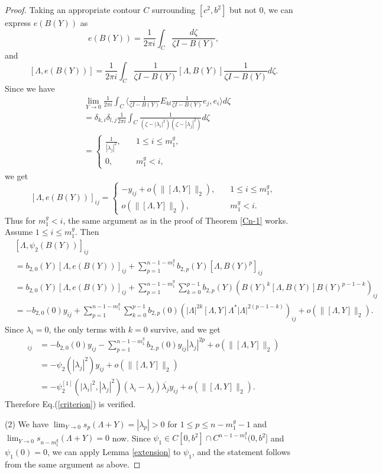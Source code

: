\documentclass[12pt]{article}
\theoremstyle{definition}
\numberwithin{equation}{section}
\newcommand{\inpr}[2]{\langle{#1,#2}\rangle}
\begin{document}
\begin{proof}
Taking an appropriate contour $C$ surrounding $[c^2,b^2]$ but not 0, we can express $e(B(Y))$ as 
\[e(B(Y))=\frac{1}{2\pi i}\int_C\frac{d\zeta}{\zeta I-B(Y)},\]
and 
\[[\Lambda,e(B(Y))]=\frac{1}{2\pi i}\int_C\frac{1}{\zeta I-B(Y)}[\Lambda,B(Y)]\frac{1}{\zeta I-B(Y)}d\zeta.\]
Since we have 
\begin{align*}
 & \lim_{Y\to 0}\frac{1}{2\pi i}\int_C\inpr{\frac{1}{\zeta I-B(Y)}E_{kl}\frac{1}{\zeta I-B(Y)}e_j}{e_i}d\zeta\\
 &=\delta_{k,i}\delta_{l,j}\frac{1}{2\pi i}\int_C\frac{1}{(\zeta-|\lambda_i|^2)(\zeta-|\lambda_j|^2)}d\zeta \\
 &=\left\{
\begin{array}{ll}
\frac{1}{|\lambda_j|^2} , &\quad 1\leq i\leq m^g_1,  \\
0 , &\quad m^g_1 < i,
\end{array}
\right.
\end{align*}
we get 
\[[\Lambda,e(B(Y))]_{ij}=\left\{
\begin{array}{ll}
	-y_{ij}+o(\|[\Lambda,Y]\|_2) , &\quad 1\leq i\leq m^g_1,  \\
	o(\|[\Lambda,Y]\|_2) , &\quad m^g_1 < i.
\end{array}
\right.\]
Thus for $m^g_1<i$, the same argument as in the proof of Theorem \ref{Cn-1} works. 
Assume $1\leq i\leq m^g_1$. 
Then 
\begin{align*}
	&[\Lambda,\psi_2(B(Y))]_{ij}  \\
	&=b_{2,0}(Y)[\Lambda,e(B(Y))]_{ij}+\sum_{p=1}^{n-1-m^g_1}b_{2,p}(Y)[\Lambda,B(Y)^p]_{ij}\\
	&=b_{2,0}(Y)[\Lambda,e(B(Y))]_{ij}+\sum_{p=1}^{n-1-m^g_1}\sum_{k=0}^{p-1}b_{2,p}(Y)(B(Y)^k[\Lambda,B(Y)]B(Y)^{p-1-k})_{ij}\\
	&=-b_{2,0}(0)y_{ij}+\sum_{p=1}^{n-1-m^g_1}\sum_{k=0}^{p-1}b_{2,p}(0)(|\Lambda|^{2k}[\Lambda,Y]\Lambda^* |\Lambda|^{2(p-1-k)})_{ij}+	o(\|[\Lambda,Y]\|_2).
\end{align*} 
Since $\lambda_i=0$, the only terms with $k=0$ survive, and we get 
\begin{align*}
[\Lambda,\psi_2(B(Y))]_{ij} 
&=-b_{2,0}(0)y_{ij}-\sum_{p=1}^{n-1-m^g_1}b_{2,p}(0)y_{ij}|\lambda_j|^{2p}+o(\|[\Lambda,Y]\|_2)\\
&=-\psi_2(|\lambda_j|^2)y_{ij}+o(\|[\Lambda,Y]\|_2)\\
&=-\psi_2^{[1]}(|\lambda_i|^2,|\lambda_j|^2)(\lambda_i-\lambda_j)\overline{\lambda_j}y_{ij}+o(\|[\Lambda,Y]\|_2). 
\end{align*} 
Therefore Eq.(\ref{criterion}) is verified. 

(2) We have $\lim_{Y\to 0}s_p(\Lambda+Y)=|\lambda_p|>0$ for $1\leq p\leq n-m^g_1-1$ and  $\lim_{Y\to 0}s_{n-m^g_1}(\Lambda+Y)=0$ now. 
Since $\psi_1 \in C[0,b^2]\cap C^{n-1-m^g_1}(0,b^2]$ and $\psi_1(0)=0$,  
we can apply Lemma \ref{extension} to $\psi_1$, and the statement follows from the same argument as above.  
\end{proof}
\end{document}
